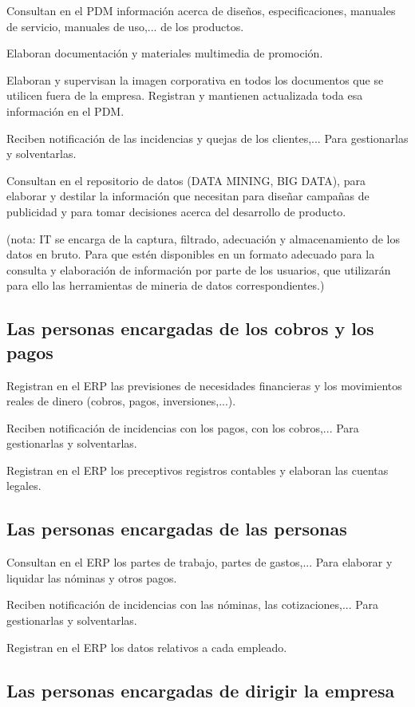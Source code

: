 \documentclass[spanish,12pt,a4paper,final,oneside]{book}
\begin{document}
Consultan en el PDM información acerca de diseños, especificaciones, manuales de servicio, manuales de uso,... de los productos.

Elaboran documentación y materiales multimedia de promoción. 

Elaboran y supervisan la imagen corporativa en todos los documentos que se utilicen fuera de la empresa. Registran y mantienen actualizada toda esa información en el PDM.

Reciben notificación de las incidencias y quejas de los clientes,... Para gestionarlas y solventarlas.

Consultan en el repositorio de datos (DATA MINING, BIG DATA), para elaborar y destilar la información que necesitan para diseñar campañas de publicidad y para tomar decisiones acerca del desarrollo de producto.

(nota: IT se encarga de la captura, filtrado, adecuación y almacenamiento de los datos en bruto. Para que estén disponibles en un formato adecuado para la consulta y elaboración de información por parte de los usuarios, que utilizarán para ello las herramientas de mineria de datos correspondientes.)

\subsection{Las personas encargadas de los cobros y los pagos}

Registran en el ERP las previsiones de necesidades financieras y los movimientos reales de dinero (cobros, pagos, inversiones,...). 

Reciben notificación de incidencias con los pagos, con los cobros,... Para gestionarlas y solventarlas.

Registran en el ERP los preceptivos registros contables y elaboran las cuentas legales.

\subsection{Las personas encargadas de las personas}

Consultan en el ERP los partes de trabajo, partes de gastos,... Para elaborar y liquidar las nóminas y otros pagos.

Reciben notificación de incidencias con las nóminas, las cotizaciones,... Para gestionarlas y solventarlas.

Registran en el ERP los datos relativos a cada empleado.

\subsection{Las personas encargadas de dirigir la empresa}
\end{document}
